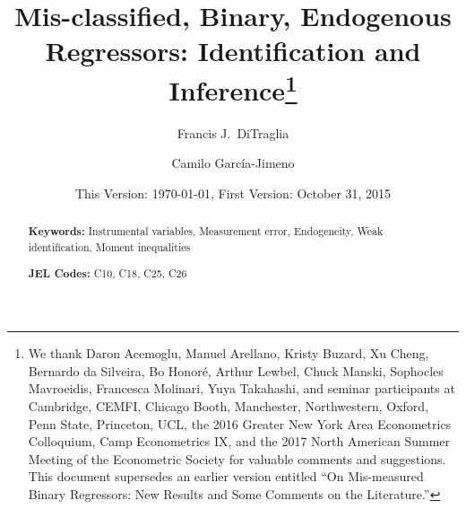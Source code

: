 \documentclass[12pt]{article}
\title{Mis-classified, Binary, Endogenous Regressors: Identification and Inference\footnote{We thank Daron Acemoglu, Manuel Arellano, Kristy Buzard, Xu Cheng, Bernardo da Silveira, Bo Honor\'{e}, Arthur Lewbel, Chuck Manski, Sophocles Mavroeidis, Francesca Molinari, Yuya Takahashi, and seminar participants at Cambridge, CEMFI, Chicago Booth, Manchester, Northwestern, Oxford, Penn State, Princeton, UCL, the 2016 Greater New York Area Econometrics Colloquium, Camp Econometrics IX, and the 2017 North American Summer Meeting of the Econometric Society for valuable comments and suggestions. This document supersedes an earlier version entitled ``On Mis-measured Binary Regressors: New Results and Some Comments on the Literature.''}}
\author[1]{Francis J.\ DiTraglia}
\author[1,2]{Camilo Garc\'{i}a-Jimeno}
\affil[1]{\normalsize Department of Economics, University of Pennsylvania}
\affil[2]{\normalsize NBER}
\date{\small This Version: \today, First Version: October 31, 2015}
\begin{document}
\maketitle


\begin{abstract}
  \singlespacing
	

  	\bigskip
	\noindent\textbf{Keywords:} Instrumental variables, Measurement error, Endogeneity,  Weak identification, Moment inequalities 

	\medskip
  \noindent\textbf{JEL Codes:} C10, C18, C25, C26
\end{abstract}

\newpage







\appendix
{}
\singlespacing \small


\normalsize

%


\small


\normalsize

\normalsize
\clearpage
{}%
\renewcommand*{\thepage}{D-\arabic{page}}


\end{document}
